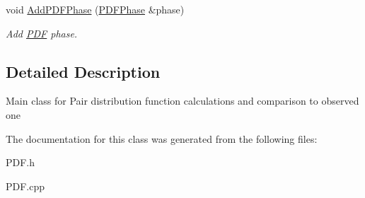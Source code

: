 \begin{DoxyCompactItemize}
\mbox{\label{class_obj_cryst_1_1_p_d_f_a4a39ea9bce2350b5786575fc4fc7a9ea}} 
void \mbox{\hyperlink{class_obj_cryst_1_1_p_d_f_a4a39ea9bce2350b5786575fc4fc7a9ea}{Add\+P\+D\+F\+Phase}} (\mbox{\hyperlink{class_obj_cryst_1_1_p_d_f_phase}{P\+D\+F\+Phase}} \&phase)
\begin{DoxyCompactList}\small\item\em Add \mbox{\hyperlink{class_obj_cryst_1_1_p_d_f}{P\+DF}} phase. \end{DoxyCompactList}\end{DoxyCompactItemize}


\subsection{Detailed Description}
Main class for Pair distribution function calculations and comparison to observed one 

The documentation for this class was generated from the following files\+:\begin{DoxyCompactItemize}
\item 
P\+D\+F.\+h\item 
P\+D\+F.\+cpp\end{DoxyCompactItemize}
